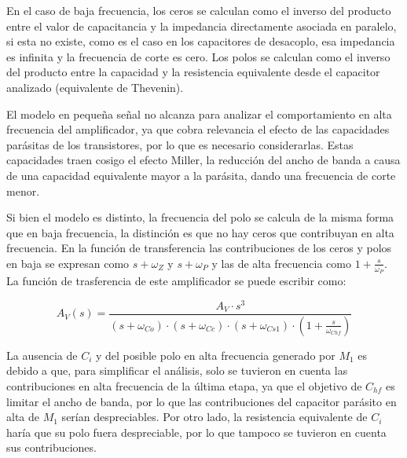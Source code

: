 En el caso de baja frecuencia, los ceros se calculan como el inverso del producto entre el valor de capacitancia y la impedancia directamente asociada en paralelo, si esta no existe, como es el caso en los capacitores de desacoplo, esa impedancia es infinita y la frecuencia de corte es cero. Los polos se calculan como el inverso del producto entre la capacidad y la resistencia equivalente desde el capacitor analizado (equivalente de Thevenin).

El modelo en pequeña señal no alcanza para analizar el comportamiento en alta frecuencia del amplificador, ya que cobra relevancia el efecto de las capacidades parásitas de los transistores, por lo que es necesario considerarlas. Estas capacidades traen cosigo el efecto Miller, la reducción del ancho de banda a causa de una capacidad equivalente mayor a la parásita, dando una frecuencia de corte menor.

Si bien el modelo es distinto, la frecuencia del polo se calcula de la misma forma que en baja frecuencia, la distinción es que no hay ceros que contribuyan en alta frecuencia. En la función de transferencia las contribuciones de los ceros y polos en baja se expresan como $s + \omega_{Z}$ y $s + \omega_{P}$ y las de alta frecuencia como $1 + \frac{s}{\omega_{P}}$. La función de trasferencia de este amplificador se puede escribir como:

\begin{equation}
  A_{V}(s) = \frac{A_V \cdot s^3}{(s + \omega_{Co}) \cdot (s + \omega_{Cc}) \cdot (s + \omega_{Cs1}) \cdot (1 + \frac{s}{\omega_{Chf}})}
\end{equation}

La ausencia de $C_i$ y del posible polo en alta frecuencia generado por $M_1$ es debido a que, para simplificar el análisis, solo se tuvieron en cuenta las contribuciones en alta frecuencia de la última etapa, ya que el objetivo de $C_{hf}$ es limitar el ancho de banda, por lo que las contribuciones del capacitor parásito en alta de $M_1$ serían despreciables. Por otro lado, la resistencia equivalente de $C_i$ haría que su polo fuera despreciable, por lo que tampoco se tuvieron en cuenta sus contribuciones.



















